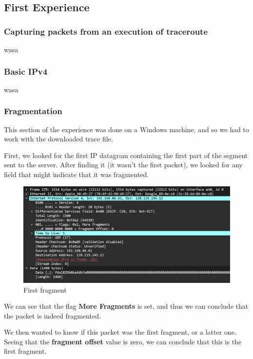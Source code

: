 \subsection{First Experience}

\subsubsection{Capturing packets from an execution of traceroute}
wasa

\subsubsection{Basic IPv4}
wasa

\subsubsection{Fragmentation}

This section of the experience was done on a Windows machine, and so we had to
work with the downloaded trace file.

First, we looked for the first IP datagram containing the first part of the
segment sent to the server. After finding it (it wasn't the first packet), we
looked for any field that might indicate that it was fragmented.

\begin{figure}[htbp]
    \centering
    \includegraphics[width=1\linewidth]{img/1/3_1.png}
    \caption{First fragment}\label{fig:exp1_3_1}
\end{figure}

We can see that the flag \textbf{More Fragments} is set, and thus we can
conclude that the packet is indeed fragmented.

We then wanted to know if this packet was the first fragment, or a latter one.
Seeing that the \textbf{fragment offset} value is zero, we can conclude that
this is the first fragment.

